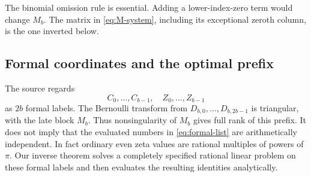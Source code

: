 The binomial omission rule is essential. Adding a lower-index-zero
term would change $M_b$. The matrix in \eqref{eq:M-system}, including
its exceptional zeroth column, is the one inverted below.

\subsection{Formal coordinates and the optimal prefix}

The source regards
\begin{equation}\label{eq:formal-list}
 C_0,\ldots,C_{b-1},\quad Z_0,\ldots,Z_{b-1}
\end{equation}
as $2b$ formal labels. The Bernoulli transform from $D_{b,0},\ldots,
D_{b,2b-1}$ is triangular, with the late block $M_b$. Thus
nonsingularity of $M_b$ gives full rank of this prefix.
It does not imply that the evaluated numbers in
\eqref{eq:formal-list} are arithmetically independent. In fact ordinary
even zeta values are rational multiples of powers of $\pi$.
Our inverse theorem solves a completely specified rational linear
problem on these formal labels and then evaluates the resulting
identities analytically.
